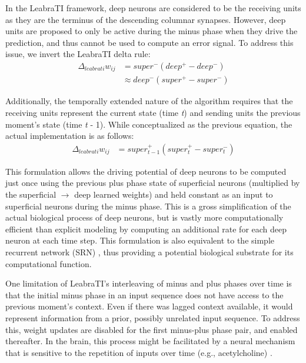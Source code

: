 \documentclass[dwyatte_dissertation.tex]{subfiles}
\begin{document}
In the LeabraTI framework, deep neurons are considered to be the receiving units as they are the terminus of the descending columnar synapses. However, deep units are proposed to only be active during the minus phase when they drive the prediction, and thus cannot be used to compute an error signal.  To address this issue, we invert the LeabraTI delta rule:
\begin{align*}
\Delta_{leabrati} w_{ij} &= super^-(deep^+ - deep^-) \\
			  &\approx deep^-(super^+ - super^-)
\end{align*}

Additionally, the temporally extended nature of the algorithm requires that the receiving units represent the current state (time \textit{t}) and sending units the previous moment's state (time \textit{t} - 1). While conceptualized as the previous equation, the actual implementation is as follows:
\begin{align*}
\Delta_{leabrati} w_{ij} &= super_{t-1}^+(super_{t}^+ - super_{t}^-)
\end{align*}

This formulation allows the driving potential of deep neurons to be computed just once using the previous plus phase state of superficial neurons (multiplied by the superficial $\rightarrow$ deep learned weights) and held constant as an input to superficial neurons during the minus phase. This is a gross simplification of the actual biological process of deep neurons, but is vastly more computationally efficient than explicit modeling by computing an additional rate for each deep neuron at each time step. This formulation is also equivalent to the simple recurrent network (SRN) \cite{Elman90,Servan-SchreiberCleeremansMcClelland91}, thus providing a potential biological substrate for its computational function. 

One limitation of LeabraTI's interleaving of minus and plus phases over time is that the initial minus phase in an input sequence does not have access to the previous moment's  context. Even if there was lagged context available, it would represent information from a prior, possibly unrelated input sequence. To address this, weight updates are disabled for the first minus-plus phase pair, and enabled thereafter. In the brain, this process might be facilitated by a neural mechanism that is sensitive to the repetition of inputs over time (e.g., acetylcholine) \cite{ThielHensonMorrisEtAl01,ThielHensonDolan02}.
\end{document}
